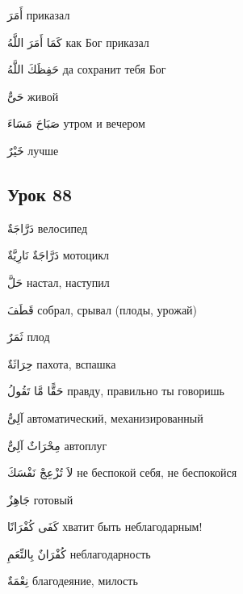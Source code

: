 \documentclass[a5paper]{article}
\newcommand\textstyleDropCaps[1]{#1}
\newcommand\textstyleCaptioncharacters[1]{#1}
\begin{document}
\textstyleCaptioncharacters{أَمَرَ }\textstyleDropCaps{приказал‎}

\textstyleCaptioncharacters{كَمَا أَمَرَ اللَّهُ }\textstyleDropCaps{как Бог приказал‎}

\textstyleCaptioncharacters{حَفِظَكَ اللَّهُ }\textstyleDropCaps{да сохранит тебя Бог‎}

\textstyleCaptioncharacters{حَىٌّ }\textstyleDropCaps{живой‎}

\textstyleCaptioncharacters{صَبَاحَ مَسَاءَ }\textstyleDropCaps{утром и ве­чером‎}

\textstyleCaptioncharacters{خَيْرٌ }\textstyleDropCaps{лучше‎}

\subsection[Урок 88‎]{\textstyleDropCaps{Урок 88‎}}
\textstyleCaptioncharacters{دَرَّاجَةٌ }\textstyleDropCaps{велосипед‎}

\textstyleCaptioncharacters{دَرَّاجَةٌ نَارِيَّةٌ }\textstyleDropCaps{мотоцикл‎}

\textstyleCaptioncharacters{حَلَّ }\textstyleDropCaps{настал, наступил‎}

\textstyleCaptioncharacters{قَطَفَ }\textstyleDropCaps{собрал, срывал (пло­ды, урожай)‎}

\textstyleCaptioncharacters{ثَمَرٌ }\textstyleDropCaps{плод‎}

\textstyleCaptioncharacters{حِرَاثَةٌ }\textstyleDropCaps{пахота, вспашка‎}

\textstyleCaptioncharacters{حَقًّا مَّا تَقُولُ }\textstyleDropCaps{правду, правильно ты говоришь‎}

\textstyleCaptioncharacters{آلِىٌّ }\textstyleDropCaps{автоматический, ме­ханизированный‎}

\textstyleCaptioncharacters{مِحْرَاثٌ آلِىٌّ }\textstyleDropCaps{автоплуг‎}

\textstyleCaptioncharacters{لاَ تُزْعِجْ نَفْسَكَ }\textstyleDropCaps{не бес­покой себя, не беспокойся‎}

\textstyleCaptioncharacters{جَاهِزٌ }\textstyleDropCaps{готовый‎}

\textstyleCaptioncharacters{كَفَى كُفْرَانًا }\textstyleDropCaps{хватит быть неблагодарным!‎}

\textstyleCaptioncharacters{كُفْرَانٌ بِالنِّعَمِ }\textstyleDropCaps{неблаго­дарность‎}

\textstyleCaptioncharacters{نِعْمَةٌ }\textstyleDropCaps{благодеяние, ми­лость‎}
\end{document}

